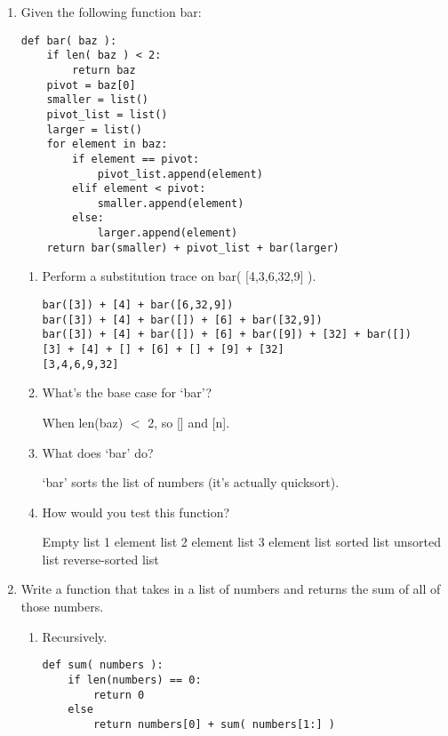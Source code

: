 \documentclass[11pt]{article}
\begin{document}
\begin{enumerate}
    \item Given the following function bar:
\begin{lstlisting}
def bar( baz ):
    if len( baz ) < 2:
        return baz
    pivot = baz[0]
    smaller = list()
    pivot_list = list()
    larger = list()
    for element in baz:
        if element == pivot:
            pivot_list.append(element)
        elif element < pivot:
            smaller.append(element)
        else:
            larger.append(element)
    return bar(smaller) + pivot_list + bar(larger)
\end{lstlisting}

        \begin{enumerate}
            \item Perform a substitution trace on bar( [4,3,6,32,9] ).
\begin{lstlisting}
bar([3]) + [4] + bar([6,32,9])
bar([3]) + [4] + bar([]) + [6] + bar([32,9])
bar([3]) + [4] + bar([]) + [6] + bar([9]) + [32] + bar([])
[3] + [4] + [] + [6] + [] + [9] + [32]
[3,4,6,9,32]
\end{lstlisting}
            \item What’s the base case for `bar'?

                When len(baz) $<$ 2, so [] and [n].
            \item What does `bar' do?

                `bar' sorts the list of numbers (it’s actually quicksort).

            \item How would you test this function?

                Empty list
                1 element list
                2 element list
                3 element list
                sorted list
                unsorted list
                reverse-sorted list

        \end{enumerate}

    \item Write a function that takes in a list of numbers and returns the sum
        of all of those numbers.
        \begin{enumerate}
            \item Recursively.
\begin{lstlisting}
def sum( numbers ):
    if len(numbers) == 0:
        return 0
    else
        return numbers[0] + sum( numbers[1:] )
\end{lstlisting}


\end{enumerate}
\end{enumerate}
\end{document}
